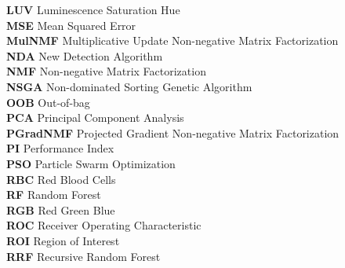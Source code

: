 \begin{nomenclature}
\begin{tabbing}
  \textbf{LUV} \> \quad \quad\quad Luminescence Saturation Hue\\


  \textbf{MSE} \> \quad \quad\quad Mean Squared Error\\

  \textbf{MulNMF} \> \quad \quad\quad Multiplicative Update Non-negative Matrix Factorization\\

  \textbf{NDA} \> \quad \quad\quad New Detection Algorithm\\

  \textbf{NMF} \> \quad \quad\quad Non-negative Matrix Factorization\\

  \textbf{NSGA} \> \quad \quad\quad Non-dominated Sorting Genetic Algorithm\\

  \textbf{OOB} \> \quad \quad\quad Out-of-bag\\

  \textbf{PCA} \> \quad \quad\quad Principal Component Analysis \\

  \textbf{PGradNMF} \> \quad \quad\quad Projected Gradient Non-negative Matrix Factorization\\

   \textbf{PI} \> \quad \quad\quad Performance Index  \\

  \textbf{PSO} \> \quad \quad\quad Particle Swarm Optimization   \\

  \textbf{RBC} \> \quad \quad\quad Red Blood Cells \\

  \textbf{RF} \> \quad \quad\quad Random Forest\\

  \textbf{RGB} \> \quad \quad\quad Red Green Blue\\

  \textbf{ROC} \> \quad \quad\quad Receiver Operating Characteristic\\

  \textbf{ROI} \> \quad \quad\quad Region of Interest\\

  \textbf{RRF} \> \quad \quad\quad Recursive Random Forest\\


\end{tabbing}
\end{nomenclature}
